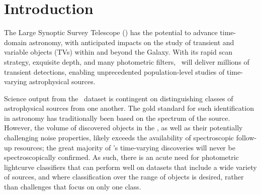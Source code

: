 \section{Introduction}
\label{sec:intro}

The Large Synoptic Survey Telescope (\lsst) has the potential to advance time-domain astronomy, with anticipated impacts on the study of transient and variable objects (TVs) within and beyond the Galaxy.
With its rapid scan strategy, exquisite depth, and many photometric filters, \lsst\ will deliver millions of transient detections, enabling unprecedented population-level studies of time-varying astrophysical sources.

Science output from the \lsst\ dataset is contingent on distinguishing classes of astrophysical sources from one another.
The gold standard for such identification in astronomy has traditionally been based on the spectrum of the source.
However, the volume of discovered objects in the \lsst, as well as their potentially challenging noise properties, likely exceeds the availability of spectroscopic follow-up resources; the great majority of \lsst's time-varying discoveries will never be spectroscopically confirmed.
As such, there is an acute need for photometric lightcurve classifiers that can perform well on datasets that include a wide variety of sources, and where classification over the range of objects is desired, rather than challenges that focus on only one class.

